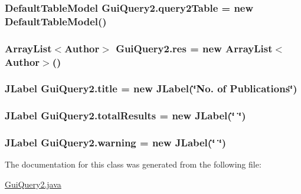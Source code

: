 \subsubsection[{\texorpdfstring{query2\+Table}{query2Table}}]{\setlength{\rightskip}{0pt plus 5cm}Default\+Table\+Model Gui\+Query2.\+query2\+Table = new Default\+Table\+Model()\hspace{0.3cm}{\ttfamily [private]}}\hypertarget{classGuiQuery2_a0b3f16b0f92eabbdea82f4abd3ba4377}{}\label{classGuiQuery2_a0b3f16b0f92eabbdea82f4abd3ba4377}
\subsubsection[{\texorpdfstring{res}{res}}]{\setlength{\rightskip}{0pt plus 5cm}Array\+List$<${\bf Author}$>$ Gui\+Query2.\+res = new Array\+List$<${\bf Author}$>$()\hspace{0.3cm}{\ttfamily [private]}}\hypertarget{classGuiQuery2_a97d061ff962c9d44c1723bc040c34458}{}\label{classGuiQuery2_a97d061ff962c9d44c1723bc040c34458}
\subsubsection[{\texorpdfstring{title}{title}}]{\setlength{\rightskip}{0pt plus 5cm}J\+Label Gui\+Query2.\+title = new J\+Label(\char`\"{}No. of Publications\char`\"{})\hspace{0.3cm}{\ttfamily [private]}}\hypertarget{classGuiQuery2_adb385146a2f0b88b98fa44c95cc4efc5}{}\label{classGuiQuery2_adb385146a2f0b88b98fa44c95cc4efc5}
\subsubsection[{\texorpdfstring{total\+Results}{totalResults}}]{\setlength{\rightskip}{0pt plus 5cm}J\+Label Gui\+Query2.\+total\+Results = new J\+Label(\char`\"{} \char`\"{})\hspace{0.3cm}{\ttfamily [private]}}\hypertarget{classGuiQuery2_a09768aea9ccb55c5e1d1d9926e2ae048}{}\label{classGuiQuery2_a09768aea9ccb55c5e1d1d9926e2ae048}
\subsubsection[{\texorpdfstring{warning}{warning}}]{\setlength{\rightskip}{0pt plus 5cm}J\+Label Gui\+Query2.\+warning = new J\+Label(\char`\"{} \char`\"{})\hspace{0.3cm}{\ttfamily [private]}}\hypertarget{classGuiQuery2_ab813118a2db6297717b32f054e5305e9}{}\label{classGuiQuery2_ab813118a2db6297717b32f054e5305e9}


The documentation for this class was generated from the following file\+:\begin{DoxyCompactItemize}
\item 
\hyperlink{GuiQuery2_8java}{Gui\+Query2.\+java}\end{DoxyCompactItemize}
